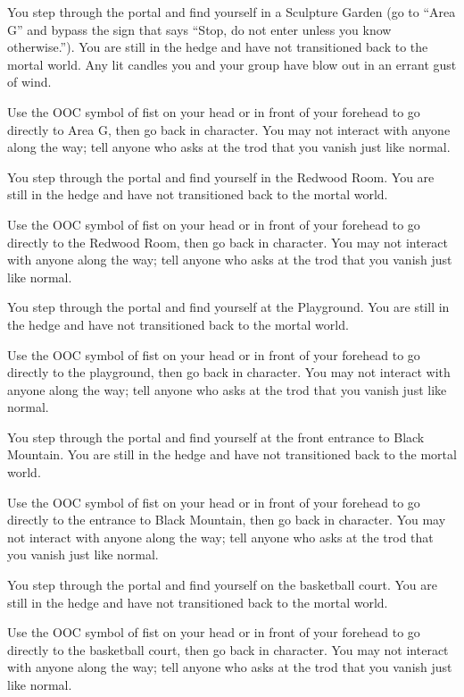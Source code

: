 \documentclass[green]{gl2018}
\begin{document}
\begin{sect}{7}

You step through the portal and find yourself in a Sculpture Garden (go to “Area G” and bypass the sign that says “Stop, do not enter unless you know otherwise.”). You are still in the hedge and have not transitioned back to the mortal world. Any lit candles you and your group have blow out in an errant gust of wind.

Use the OOC symbol of fist on your head or in front of your forehead to go directly to Area G, then go back in character. You may not interact with anyone along the way; tell anyone who asks at the trod that you vanish just like normal.
\end{sect}
\begin{sect}{8}
You step through the portal and find yourself in the Redwood Room. You are still in the hedge and have not transitioned back to the mortal world.

Use the OOC symbol of fist on your head or in front of your forehead to go directly to the Redwood Room, then go back in character. You may not interact with anyone along the way; tell anyone who asks at the trod that you vanish just like normal.
\end{sect}
\begin{sect}{9}
You step through the portal and find yourself at the Playground. You are still in the hedge and have not transitioned back to the mortal world.

Use the OOC symbol of fist on your head or in front of your forehead to go directly to the playground, then go back in character. You may not interact with anyone along the way; tell anyone who asks at the trod that you vanish just like normal.

\end{sect}
\begin{sect}{10}
You step through the portal and find yourself at the front entrance to Black Mountain. You are still in the hedge and have not transitioned back to the mortal world.

Use the OOC symbol of fist on your head or in front of your forehead to go directly to the entrance to Black Mountain, then go back in character. You may not interact with anyone along the way; tell anyone who asks at the trod that you vanish just like normal.
\end{sect}
\begin{sect}{11}
You step through the portal and find yourself on the basketball court. You are still in the hedge and have not transitioned back to the mortal world.

Use the OOC symbol of fist on your head or in front of your forehead to go directly to the basketball court, then go back in character. You may not interact with anyone along the way; tell anyone who asks at the trod that you vanish just like normal.


\end{sect}
\end{document}
